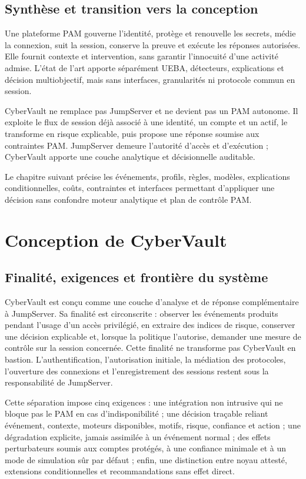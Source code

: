 \documentclass[11pt,a4paper,oneside]{report}
\theoremstyle{definition}
\theoremstyle{plain}
\begin{document}
\section{Synthèse et transition vers la conception}

Une plateforme PAM gouverne l'identité, protège et renouvelle les secrets, médie la connexion, suit la session, conserve la preuve et exécute les réponses autorisées. Elle fournit contexte et intervention, sans garantir l'innocuité d'une activité admise. L'état de l'art apporte séparément UEBA, détecteurs, explications et décision multiobjectif, mais sans interfaces, granularités ni protocole commun en session.

CyberVault ne remplace pas JumpServer et ne devient pas un PAM autonome. Il exploite le flux de session déjà associé à une identité, un compte et un actif, le transforme en risque explicable, puis propose une réponse soumise aux contraintes PAM. JumpServer demeure l'autorité d'accès et d'exécution ; CyberVault apporte une couche analytique et décisionnelle auditable.

Le chapitre suivant précise les événements, profils, règles, modèles, explications conditionnelles, coûts, contraintes et interfaces permettant d'appliquer une décision sans confondre moteur analytique et plan de contrôle PAM.

\chapter{Conception de CyberVault}
\label{chap:architecture}

\section{Finalité, exigences et frontière du système}

CyberVault est conçu comme une couche d'analyse et de réponse complémentaire à
JumpServer. Sa finalité est circonscrite : observer les événements produits
pendant l'usage d'un accès privilégié, en extraire des indices de risque,
conserver une décision explicable et, lorsque la politique l'autorise, demander
une mesure de contrôle sur la session concernée. Cette finalité ne transforme
pas CyberVault en bastion. L'authentification, l'autorisation initiale, la
médiation des protocoles, l'ouverture des connexions et l'enregistrement des
sessions restent sous la responsabilité de JumpServer.

Cette séparation impose cinq exigences : une intégration non intrusive qui ne
bloque pas le PAM en cas d'indisponibilité ; une décision traçable reliant
événement, contexte, moteurs disponibles, motifs, risque, confiance et action ;
une dégradation explicite, jamais assimilée à un événement normal ; des effets
perturbateurs soumis aux comptes protégés, à une confiance minimale et à un
mode de simulation sûr par défaut ; enfin, une distinction entre noyau attesté,
extensions conditionnelles et recommandations sans effet direct.
\end{document}
